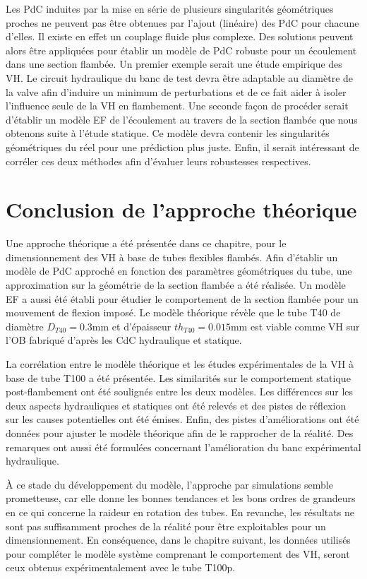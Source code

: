 Les PdC induites par la mise en série de plusieurs singularités géométriques proches ne peuvent pas être obtenues par l'ajout (linéaire) des PdC pour chacune d'elles. Il existe en effet un couplage fluide plus complexe. Des solutions peuvent alors être appliquées pour établir un modèle de PdC robuste pour un écoulement dans une section flambée. Un premier exemple serait une étude empirique des VH. Le circuit hydraulique du banc de test devra être adaptable au diamètre de la valve afin d'induire un minimum de perturbations et de ce fait aider à isoler l'influence seule de la VH en flambement. Une seconde façon de procéder serait d'établir un modèle EF de l'écoulement au travers de la section flambée que nous obtenons suite à l'étude statique. Ce modèle devra contenir les singularités géométriques du réel pour une prédiction plus juste. Enfin, il serait intéressant de corréler ces deux méthodes afin d'évaluer leurs robustesses respectives.
\section{Conclusion de l'approche théorique}
Une approche théorique a été présentée dans ce chapitre, pour le dimensionnement des VH à base de tubes flexibles flambés. Afin d'établir un modèle de PdC approché en fonction des paramètres géométriques du tube, une approximation sur la géométrie de la section flambée a été réalisée. Un modèle EF a aussi été établi pour étudier le comportement de la section flambée pour un mouvement de flexion imposé. Le modèle théorique révèle que le tube T40 de diamètre $D_{T40}=0.3$mm et d'épaisseur $th_{T40}=0.015$mm est viable comme VH sur l'OB fabriqué d'après les CdC hydraulique et statique.

La corrélation entre le modèle théorique et les études expérimentales de la VH à base de tube T100 a été présentée. Les similarités sur le comportement statique post-flambement ont été soulignés entre les deux modèles. Les différences sur les deux aspects hydrauliques et statiques ont été relevés et des pistes de réflexion sur les causes potentielles ont été émises. Enfin, des pistes d'améliorations ont été données pour ajuster le modèle théorique afin de le rapprocher de la réalité. Des remarques ont aussi été formulées concernant l'amélioration du banc expérimental hydraulique.

À ce stade du développement du modèle, l'approche par simulations semble prometteuse, car elle donne les bonnes tendances et les bons ordres de grandeurs en ce qui concerne la raideur en rotation des tubes. En revanche, les résultats ne sont pas suffisamment proches de la réalité pour être exploitables pour un dimensionnement. En conséquence, dans le chapitre suivant, les données utilisés pour compléter le modèle système comprenant le comportement des VH, seront ceux obtenus expérimentalement avec le tube T100p.

